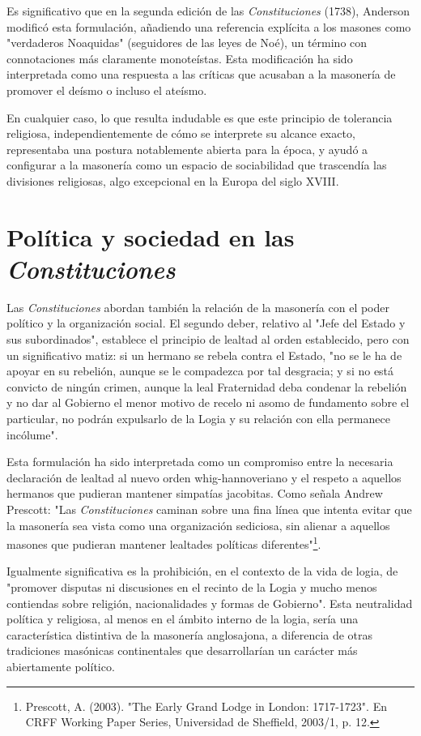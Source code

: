 \documentclass[a4paper,12pt,twoside]{book}
\begin{document}
Es significativo que en la segunda edición de las \textit{Constituciones} (1738), Anderson modificó esta formulación, añadiendo una referencia explícita a los masones como "verdaderos Noaquidas" (seguidores de las leyes de Noé), un término con connotaciones más claramente monoteístas. Esta modificación ha sido interpretada como una respuesta a las críticas que acusaban a la masonería de promover el deísmo o incluso el ateísmo.

En cualquier caso, lo que resulta indudable es que este principio de tolerancia religiosa, independientemente de cómo se interprete su alcance exacto, representaba una postura notablemente abierta para la época, y ayudó a configurar a la masonería como un espacio de sociabilidad que trascendía las divisiones religiosas, algo excepcional en la Europa del siglo XVIII.

\section{Política y sociedad en las \textit{Constituciones}}

Las \textit{Constituciones} abordan también la relación de la masonería con el poder político y la organización social. El segundo deber, relativo al "Jefe del Estado y sus subordinados", establece el principio de lealtad al orden establecido, pero con un significativo matiz: si un hermano se rebela contra el Estado, "no se le ha de apoyar en su rebelión, aunque se le compadezca por tal desgracia; y si no está convicto de ningún crimen, aunque la leal Fraternidad deba condenar la rebelión y no dar al Gobierno el menor motivo de recelo ni asomo de fundamento sobre el particular, no podrán expulsarlo de la Logia y su relación con ella permanece incólume".

Esta formulación ha sido interpretada como un compromiso entre la necesaria declaración de lealtad al nuevo orden whig-hannoveriano y el respeto a aquellos hermanos que pudieran mantener simpatías jacobitas. Como señala Andrew Prescott: "Las \textit{Constituciones} caminan sobre una fina línea que intenta evitar que la masonería sea vista como una organización sediciosa, sin alienar a aquellos masones que pudieran mantener lealtades políticas diferentes"\footnote{Prescott, A. (2003). "The Early Grand Lodge in London: 1717-1723". En CRFF Working Paper Series, Universidad de Sheffield, 2003/1, p. 12.}.

Igualmente significativa es la prohibición, en el contexto de la vida de logia, de "promover disputas ni discusiones en el recinto de la Logia y mucho menos contiendas sobre religión, nacionalidades y formas de Gobierno". Esta neutralidad política y religiosa, al menos en el ámbito interno de la logia, sería una característica distintiva de la masonería anglosajona, a diferencia de otras tradiciones masónicas continentales que desarrollarían un carácter más abiertamente político.
\end{document}
